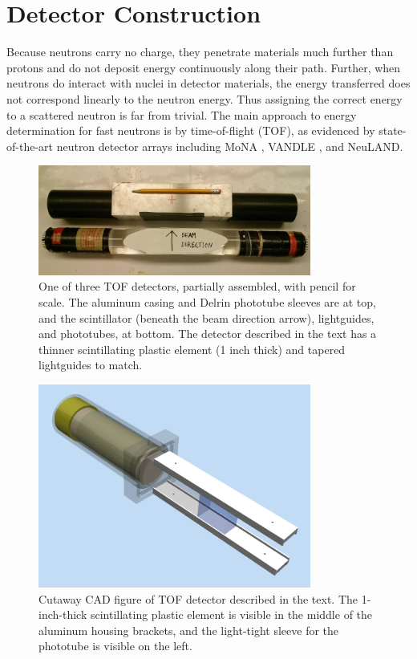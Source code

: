 \section{Detector Construction}
Because neutrons carry no charge, they penetrate materials much further than protons and do not
deposit energy continuously along their path. Further, when neutrons do interact with nuclei in
detector materials, the energy transferred does not correspond linearly to the neutron energy. Thus
assigning the correct energy to a scattered neutron is far from trivial. The main approach to
energy determination for fast neutrons is by time-of-flight (\gls{TOF}),
as evidenced by state-of-the-art
neutron detector arrays including MoNA \cite{MoNA}, VANDLE \cite{VANDLE}, and
NeuLAND\cite{NeuLAND}.

\begin{figure}[tb]
    \centering
    \includegraphics[width=0.8\textwidth]{figures/Scintillator_disassembled.jpg}
    \caption[TOF detector partially assembled]
    {One of three TOF detectors, partially assembled, with pencil for scale.
        The aluminum casing and Delrin phototube sleeves are at top, and the
        scintillator (beneath the beam direction arrow), lightguides, and phototubes, at
        bottom. The detector described in the text has a thinner scintillating plastic
    element (1 inch thick) and tapered lightguides to match.}
    \label{TOFDetectorDisassembled}
\end{figure}
\begin{figure}[tb]
    \centering
    \includegraphics[width=0.8\textwidth]{figures/TimeOfFlightCAD.png}
    \caption[Cutaway CAD figure of TOF detector.]
    {
        Cutaway CAD figure of TOF detector described in the text. The 
        1-inch-thick scintillating plastic element is visible in the middle of the aluminum 
        housing brackets, and the light-tight sleeve for the phototube is visible on
        the left.
    }
    \label{TOFCAD}
\end{figure}

